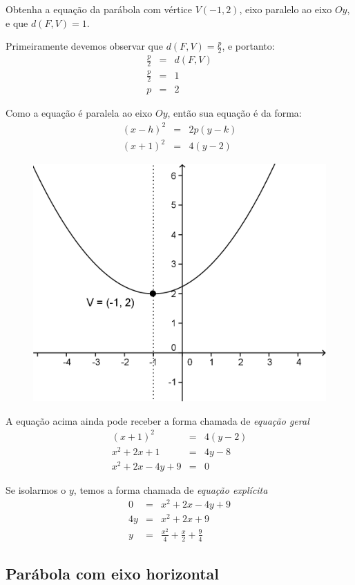\begin{exemplo} Obtenha a equação da parábola com vértice $V(-1, 2)$, eixo paralelo ao eixo $Oy$, e que $d(F, V)=1$.

Primeiramente devemos observar que $d(F, V)=\frac{p}{2}$, e portanto:
\begin{eqnarray*}
\frac{p}{2} & = & d(F, V)   \\
\frac{p}{2} & = & 1   \\
p & = & 2
\end{eqnarray*}

Como a equação é paralela ao eixo $Oy$, então sua equação é da forma:
\begin{eqnarray*}
(x-h)^2&=&2p(y-k)  \\
(x+1)^2&=&4(y-2)
\end{eqnarray*}


\begin{figure}[H]
\centering
\includegraphics[width=0.4\linewidth]{analitica/imagens/exemplo1.png}
\label{fig:exe1}
\end{figure}

A equação acima ainda pode receber a forma chamada de \textit{equação geral}
\begin{eqnarray*}
(x+1)^2&=&4(y-2) \\
x^2+2x+1&=&4y-8 \\
x^2+2x-4y+9&=&0
\end{eqnarray*}


Se isolarmos o $y$, temos a forma chamada de \textit{equação explícita}
\begin{eqnarray*}
0&=&x^2+2x-4y+9 \\
4y&=&x^2+2x+9 \\
y&=&\frac{x^2}{4}+\frac{x}{2}+\frac{9}{4}
\end{eqnarray*}


\end{exemplo}


\subsection{Parábola com eixo horizontal}

